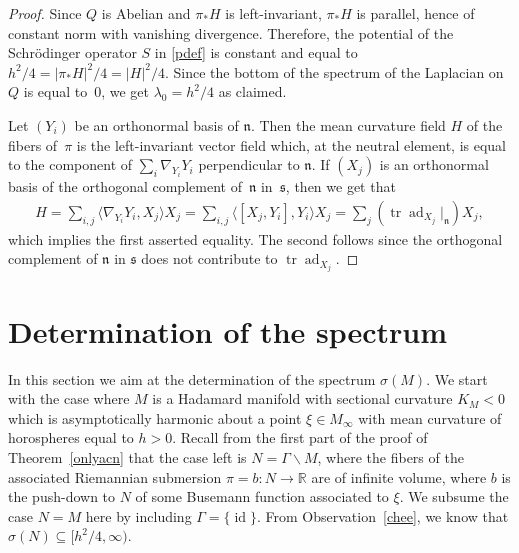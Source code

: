 \documentclass[10pt,a4paper]{amsart}
\numberwithin{equation}{section}
\DeclareMathOperator{\ad}{ad}
\DeclareMathOperator{\id}{id}
\DeclareMathOperator{\tr}{tr}
\def\R{\mathbb R}
\begin{document}
\begin{proof}
Since $Q$ is Abelian and $\pi_*H$ is left-invariant,
$\pi_*H$ is parallel, hence of constant norm with vanishing divergence.
Therefore, the potential of the Schr\"odinger operator $S$ in \eqref{pdef} is constant
and equal to $h^2/4=|\pi_*H|^2/4=|H|^2/4$.
Since the bottom of the spectrum of the Laplacian on~$Q$ is equal to~$0$,
we get $\lambda_0=h^2/4$ as claimed.

Let $(Y_i)$ be an orthonormal basis of $\mathfrak n$.
Then the mean curvature field $H$ of the fibers of~$\pi$ is the left-invariant vector field
which, at the neutral element, is equal to the component of $\sum_i\nabla_{Y_i}Y_i$
perpendicular to $\mathfrak n$.
If $(X_j)$ is an orthonormal basis of the orthogonal complement of~$\mathfrak n$ in~$\mathfrak s$,
then we get that
\begin{align*}%
	H = \sum_{i,j}\langle\nabla_{Y_i}Y_i,X_j\rangle X_j
	= \sum_{i,j}\langle[X_j,Y_i],Y_i\rangle X_j
	= \sum_j(\tr\ad_{X_j}|_{\mathfrak n})X_j,
\end{align*}
which implies the first asserted equality.
The second follows since the orthogonal complement of $\mathfrak n$ in $\mathfrak s$
does not contribute to $\tr\ad_{X_j}$.
\end{proof}


\section{Determination of the spectrum}\label{secsig}

In this section we aim at the determination of the spectrum $\sigma(M)$.
We start with the case where $M$ is a Hadamard manifold with sectional curvature $K_M<0$
which is asymptotically harmonic about a point $\xi\in M_\infty$
with mean curvature of horospheres equal to $h>0$.
Recall from the first part of the proof of Theorem~\ref{onlyacn}
that the case left is $N=\Gamma\backslash M$,
where the fibers of the associated Riemannian submersion $\pi=b\colon N\to\R$ are of infinite volume,
where $b$ is the push-down to $N$ of some Busemann function associated to $\xi$.
We subsume the case $N=M$ here by including $\Gamma=\{\id\}$.
From Observation~\ref{chee}, we know that $\sigma(N)\subseteq\bigl[h^2/4,\infty\bigr)$.
\end{document}
